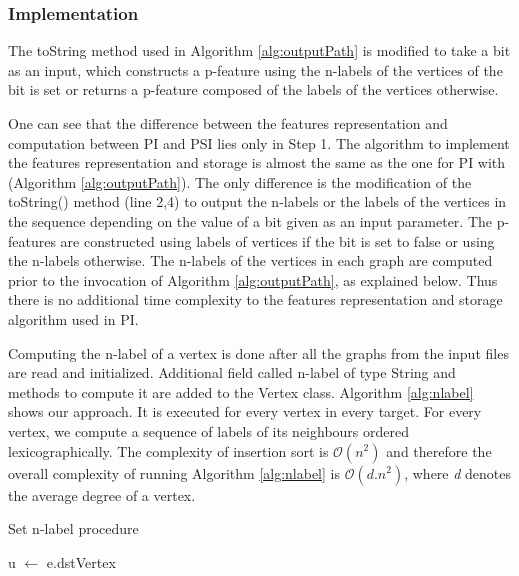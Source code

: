 \documentclass{l4proj}
\begin{document}
\subsubsection{Implementation}

The toString method used in Algorithm \ref{alg:outputPath} is modified to take a bit as an input, which constructs a p-feature using the n-labels of the vertices of the bit is set or returns a p-feature composed of the labels of the vertices otherwise.

One can see that the difference between the features representation and computation between PI and PSI lies only in Step 1. The algorithm to implement the features representation and storage is almost the same as the one for PI with (Algorithm \ref{alg:outputPath}). The only difference is the modification of the toString() method (line 2,4) to output the n-labels or the labels of the vertices in the sequence depending on the value of a bit given as an input parameter. The p-features are constructed using labels of vertices if the bit is set to false or using the n-labels otherwise. The n-labels of the vertices in each graph are computed prior to the invocation of Algorithm \ref{alg:outputPath}, as explained below. Thus there is no additional time complexity to the features representation and storage algorithm used in PI.

Computing the n-label of a vertex is done after all the graphs from the input files are read and initialized. Additional field called n-label of type String and methods to compute it are added to the Vertex class. Algorithm \ref{alg:nlabel} shows our approach. It is executed for every vertex in every target. For every vertex, we compute a sequence of labels of its neighbours ordered lexicographically. The complexity of insertion sort is $\mathcal{O}(n^{2})$ \cite{backtracking-algorithms} and therefore the overall complexity of running Algorithm \ref{alg:nlabel} is $\mathcal{O}(d.n^{2})$, where \emph{d} denotes the average degree of a vertex.
 
\begin{algorithm}
\centering
\caption{Set n-label procedure}
\label{alg:nlabel}
\begin{algorithmic}[1]
\State u $\gets$ e.dstVertex
\State {} 
\EndFor
\EndProcedure
{} 
\end{algorithmic}
\end{algorithm}
\end{document}
